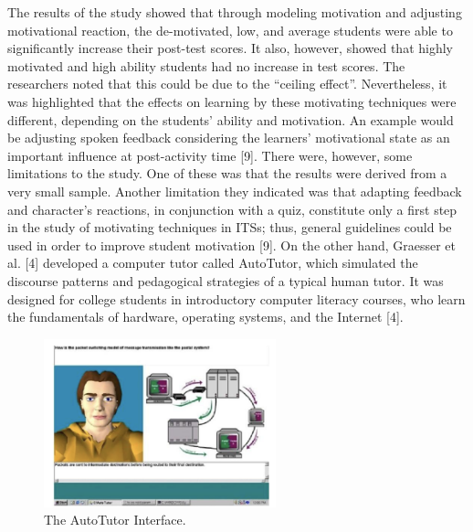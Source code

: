 
 The results of the study showed that through modeling motivation and adjusting motivational reaction, the de-motivated, low, and average students were able to significantly increase their post-test scores. It also, however, showed that highly motivated and high ability students had no increase in test scores. The researchers noted that this could be due to the “ceiling effect”. Nevertheless, it was highlighted that the effects on learning by these motivating techniques were different, depending on the students’ ability and motivation. An example would be adjusting spoken feedback considering the learners’ motivational state as an important influence at post-activity time [9].
There were, however, some limitations to the study. One of these was that the results were derived from a very small sample. Another limitation they indicated was that adapting feedback and character’s reactions, in conjunction with a quiz, constitute only a first step in the study of motivating techniques in ITSs; thus, general guidelines could be used in order to improve student motivation [9].
On the other hand, Graesser et al. [4] developed a computer tutor called AutoTutor, which simulated the discourse patterns and pedagogical strategies of a typical human tutor. It was designed for college students in introductory computer literacy courses, who learn the fundamentals of hardware, operating systems, and the Internet [4].

\begin{figure}[!ht] 
    \centering
    \includegraphics[width=0.6\textwidth,height=0.3\textheight]{figures/Figure_2-2.png}
    \caption{The AutoTutor Interface.}
    \label{fig:Figure_2-2.png}
\end{figure}

